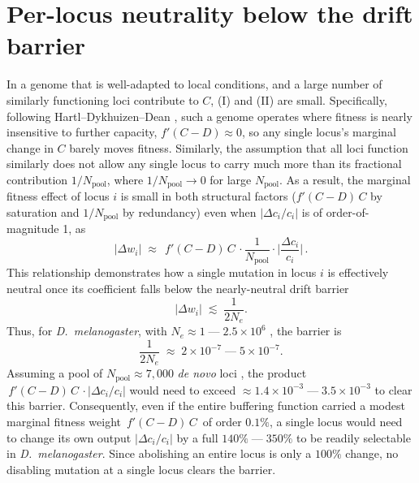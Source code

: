 \documentclass[10pt]{article}
\newcommand{\Ne}{N_e}
\newcommand{\Npool}{N_{\mathrm{pool}}}
\newcommand{\dm}{\textit{D.\ melanogaster}}
\begin{document}
\section{Per-locus neutrality below the drift barrier}

In a genome that is well-adapted to local conditions, and a large number of similarly functioning loci contribute to $C$,
(I) and (II) are small. Specifically, following Hartl--Dykhuizen--Dean \citep{hartl85}, such a genome
operates where fitness is nearly insensitive to further capacity, $f'(C-D) \approx 0$, so any single locus's
marginal change in $C$ barely moves fitness. Similarly, the assumption that all loci function
similarly does not allow any single locus to carry much more than its fractional contribution $1/\Npool$, 
where $1/\Npool \to 0$ for large $\Npool$. As a result, the marginal fitness effect of locus $i$ is small in both structural factors ($f'(C-D)\,C$ by saturation and $1/\Npool$ by redundancy) even when $|\Delta c_i/c_i|$ is of order-of-magnitude 1, as
\begin{equation}
|\Delta w_i| \;\approx\; \,f'(C-D)\,C\,\cdot\frac{1}{\Npool}\cdot\Big|\frac{\Delta c_i}{c_i}\Big| \, .
\end{equation}
This relationship demonstrates how a single mutation in locus $i$ is effectively neutral once its coefficient 
falls below the nearly-neutral drift barrier \citep{kimura68,ohta73,lynch11}
\begin{equation}
|\Delta w_i| \;\lesssim\; \frac{1}{2\Ne}.
\end{equation}
Thus, for \dm{}, with
$\Ne\approx 1 \;\text{---}\; 2.5\times10^{6}$ \citep{emerson08,kreitman83}, the barrier is
\begin{equation}
\frac{1}{2\Ne} \;\approx\; 2\times10^{-7} \;\text{---}\; 5\times10^{-7}.
\end{equation}
Assuming a pool of $\Npool\approx 7{,}000$ \emph{de novo} loci \citep{grandchamp23}, the product $\,f'(C-D)\,C\,\cdot\big|\Delta c_i/c_i\big|$
would need to exceed $\approx 1.4\times10^{-3} \;\text{---}\; 3.5\times10^{-3}$ to clear this barrier.
Consequently, even if the entire buffering function carried a modest marginal fitness weight $\,f'(C-D)\,C\,$ of order $0.1\%$, a single locus would need to change its own output $\big|\Delta c_i/c_i\big|$ by a full $140\% \;\text{---}\; 350\%$ to be readily selectable in \dm{}. Since abolishing an entire locus is only a $100\%$ change, no disabling mutation at a single locus clears the barrier.
\end{document}
